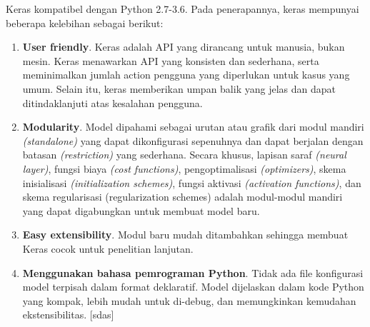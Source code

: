 \documentclass[../thesis.tex]{subfiles}
\begin{document}
Keras kompatibel dengan Python 2.7-3.6. Pada penerapannya, keras mempunyai beberapa
kelebihan sebagai berikut:
\begin{enumerate}
	\item \textbf{User friendly}. Keras adalah API yang dirancang untuk manusia, bukan mesin. Keras menawarkan API yang konsisten dan sederhana, serta meminimalkan jumlah action
	pengguna yang diperlukan untuk kasus yang umum. Selain itu, keras memberikan umpan balik yang jelas dan dapat ditindaklanjuti atas kesalahan pengguna.
	\item \textbf{Modularity}. Model dipahami sebagai urutan atau grafik dari modul mandiri \textit{(standalone)}
	yang dapat dikonfigurasi sepenuhnya dan dapat berjalan dengan batasan \textit{(restriction)} yang sederhana. Secara khusus, lapisan saraf \textit{(neural layer)}, fungsi biaya \textit{(cost functions)}, pengoptimalisasi \textit{(optimizers)}, skema inisialisasi \textit{(initialization schemes)}, fungsi aktivasi
	\textit{(activation functions)}, dan skema regularisasi (regularization schemes) adalah modul-modul mandiri yang dapat digabungkan untuk membuat model baru.
	\item \textbf{Easy extensibility}. Modul baru mudah ditambahkan sehingga membuat Keras cocok untuk penelitian lanjutan.
	\item \textbf{Menggunakan bahasa pemrograman Python}. Tidak ada file konfigurasi model
	terpisah dalam format deklaratif. Model dijelaskan dalam kode Python yang kompak,
	lebih mudah untuk di-debug, dan memungkinkan kemudahan ekstensibilitas. [sdas]
\end{enumerate}
\end{document}
